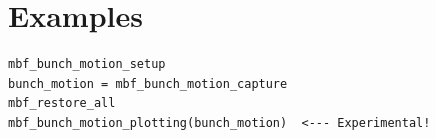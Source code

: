 \documentclass{report}
\begin{document}
\section{Examples}

\begin{verbatim}
mbf_bunch_motion_setup
bunch_motion = mbf_bunch_motion_capture
mbf_restore_all
mbf_bunch_motion_plotting(bunch_motion)  <--- Experimental!
\end{verbatim}
\end{document}
